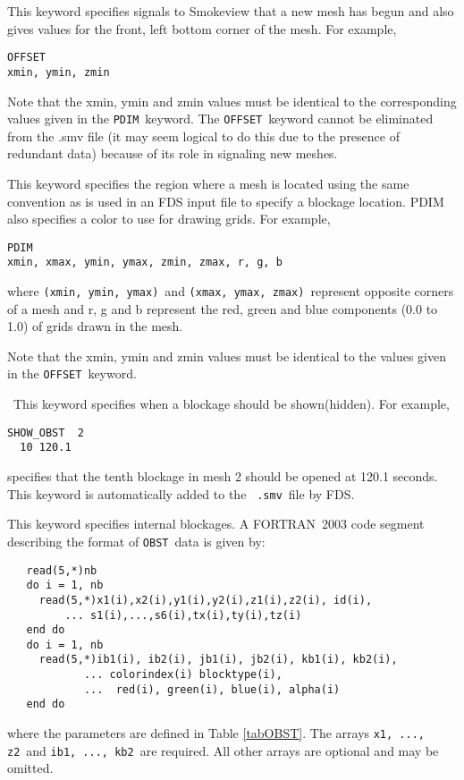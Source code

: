 \documentclass[11pt,twoside]{book}
\begin{document}
{This keyword specifies signals to Smokeview that a new mesh has begun and also
gives values for the front, left bottom corner of the mesh.  For example,
\begin{lstlisting}
OFFSET
xmin, ymin, zmin
\end{lstlisting}

Note that the xmin, ymin and zmin values must be identical to the corresponding values given in
the {\tt PDIM}\ keyword. The {\tt OFFSET}\ keyword cannot be eliminated from the .smv file
(it may seem logical to do this due
to the presence of redundant data) because of its role in signaling new meshes.

This keyword specifies the region where a mesh is located
using the same convention as is used in an FDS input file to specify a blockage location.
PDIM also specifies a color to use for drawing grids.  For example,
\begin{lstlisting}
PDIM
xmin, xmax, ymin, ymax, zmin, zmax, r, g, b
\end{lstlisting}
where {\tt (xmin,~ymin,~ymax)}\ and {\tt (xmax,~ymax,~zmax)}\
represent opposite corners of a mesh
and r, g and b represent the red, green and blue components (0.0 to 1.0) of grids drawn
in the mesh.

Note that the xmin, ymin and zmin values must be identical to the values given in the
{\tt OFFSET}\ keyword.


\ This keyword specifies when a
blockage should be shown(hidden). For example,
\begin{lstlisting}
SHOW_OBST  2
  10 120.1
\end{lstlisting}
specifies that the tenth blockage in mesh 2 should be opened at
120.1 seconds.  This keyword is automatically added to the {\tt
.smv}\ file by FDS.

This keyword specifies internal blockages. A
FORTRAN~2003 code segment describing the format of {\tt OBST}\ data
is given by:
\begin{lstlisting}
   read(5,*)nb
   do i = 1, nb
     read(5,*)x1(i),x2(i),y1(i),y2(i),z1(i),z2(i), id(i),
         ... s1(i),...,s6(i),tx(i),ty(i),tz(i)
   end do
   do i = 1, nb
     read(5,*)ib1(i), ib2(i), jb1(i), jb2(i), kb1(i), kb2(i),
            ... colorindex(i) blocktype(i),
            ...  red(i), green(i), blue(i), alpha(i)
   end do
\end{lstlisting}
where the parameters are defined in Table \ref{tabOBST}.
The arrays {\tt x1, ..., z2}\ and {\tt ib1, ..., kb2}\ are
required. All other arrays are optional and may be omitted.

}
\end{document}
